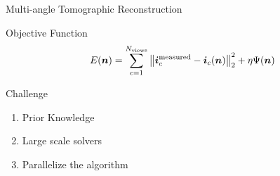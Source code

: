 \documentclass[compress,red,12pt]{beamer}
\begin{document}

\begin{frame}{Multi-angle Tomographic Reconstruction}
  {
    \begin{center}
      \centerline{\def\svgwidth{\linewidth}\small{}}
    \end{center}
  }
  {
    \begin{block}{Objective Function}
      \begin{equation*}
        E(\bm{n})
        = \sum_{c=1}^{N_{\rm views}}
        \left\| {\bm i}^{\rm measured}_c - {\bm i}_c ({\bm n})
        \right\|^2_2  + \eta \Psi ({\bm n})
      \end{equation*}
    \end{block}
  }
\end{frame}


\begin{frame}{Challenge}
  \begin{center}
    \centering
    {
      \begin{enumerate}
      \item Prior Knowledge
      \item Large scale solvers
      \item Parallelize the algorithm
      \end{enumerate}
    }
  \end{center}
\end{frame}

\end{document}

